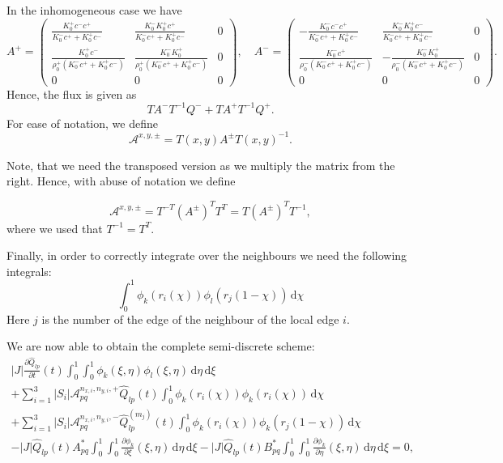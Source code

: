 \documentclass[a4paper]{scrartcl}
\newcommand{\dd}[1]{\,\mathrm{d}#1}
\begin{document}
In the inhomogeneous case we have
\begin{equation}
 A^{+} = \begin{pmatrix}
 \frac{K_0^+c^-c^+}{K_0^-c^++K_0^+c^-} & \frac{K_0^-K_0^+c^+}{K_0^-c^++K_0^+c^-} & 0 \\
 \frac{K_0^+c^-}{\rho_0^+\left(K_0^-c^++K_0^+c^-\right)} & \frac{K_0^-K_0^+}{\rho_0^+\left(K_0^-c^++K_0^+c^-\right)} & 0 \\
 0 & 0 & 0
\end{pmatrix}, \quad
 A^{-} = \begin{pmatrix}
 -\frac{K_0^-c^-c^+}{K_0^-c^++K_0^+c^-} & \frac{K_0^-K_0^+c^-}{K_0^-c^++K_0^+c^-} & 0 \\
 \frac{K_0^-c^+}{\rho_0^-\left(K_0^-c^++K_0^+c^-\right)} & -\frac{K_0^-K_0^+}{\rho_0^-\left(K_0^-c^++K_0^+c^-\right)} & 0 \\
 0 & 0 & 0
\end{pmatrix}.
\end{equation}
Hence, the flux is given as
\begin{equation}
 TA^-T^{-1}Q^- + TA^+T^{-1}Q^+.
\end{equation}
For ease of notation, we define
\begin{equation}
 \mathcal{A}^{x,y,\pm} = T(x,y)A^\pm T(x,y)^{-1}.
\end{equation}

Note, that we need the transposed version as we multiply the matrix from the right. Hence,
with abuse of notation we define

\begin{equation}
 \mathcal{A}^{x,y,\pm} = T^{-T}\left(A^\pm\right)^T T^{T} = T\left(A^\pm\right)^T T^{-1},
\end{equation}
where we used that $T^{-1}=T^T$.

Finally, in order to correctly integrate over the neighbours we need the following integrals:
$$
\int_0^1\phi_k(r_i(\chi))\phi_l(r_j(1-\chi))\dd{\chi}
$$
Here $j$ is the number of the edge of the neighbour of the local edge $i$.

We are now able to obtain the complete semi-discrete scheme:
\begin{multline}
|J|\frac{\partial \hat{Q}_{lp}}{\partial t}(t)\int_{0}^{1}\int_{0}^{1}\phi_k(\xi,\eta)\phi_l(\xi,\eta)\dd{\eta}\dd{\xi} \\
 + \sum_{i=1}^3 |S_i|\mathcal{A}_{pq}^{n_{x,i},n_{y,i},+}\hat{Q}_{lp}(t)\int_0^1\phi_k(r_i(\chi))\phi_k(r_i(\chi))\dd{\chi} \\
 + \sum_{i=1}^3 |S_i|\mathcal{A}_{pq}^{n_{x,i},n_{y,i},-}\hat{Q}_{lp}^{(m_j)}(t)\int_0^1\phi_k(r_i(\chi))\phi_k(r_j(1-\chi))\dd{\chi}\\
 - |J|\hat{Q}_{lp}(t)A^*_{pq}\int_{0}^{1}\int_{0}^{1}\frac{\partial \phi_k}{\partial \xi}(\xi,\eta)\dd{\eta}\dd{\xi}
 - |J|\hat{Q}_{lp}(t)B^*_{pq}\int_{0}^{1}\int_{0}^{1}\frac{\partial \phi_k}{\partial \eta}(\xi,\eta)\dd{\eta}\dd{\xi} = 0,
\end{multline}
\end{document}
